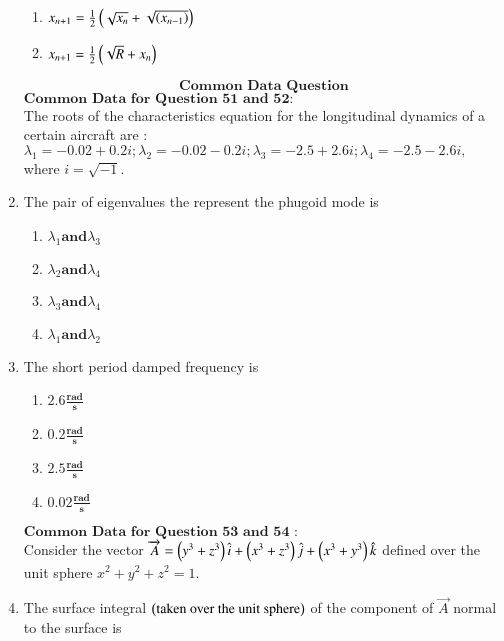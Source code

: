 \documentclass[journal]{IEEEtran}
\begin{document}
\begin{enumerate}[start=49]
\begin{multicols}{2}
\begin{enumerate}
        \item $x_{n+1}=\frac{1}{2}\left(\sqrt{x_{n}}+\sqrt{\left(x_{n-1}\right)}\right)$
        \item $x_{n+1}=\frac{1}{2}\left(\sqrt{R}+x_{n}\right)$        
    \end{enumerate}
\end{multicols}
\bigskip
$$\textbf{Common Data Question}$$
$\textbf{Common Data for Question 51 and 52:}$\\
The roots of the characteristics equation for the longitudinal dynamics of a certain aircraft are :
$\lambda_{1}=-0.02+0.2i;\lambda_{2}=-0.02-0.2i; \lambda_{3}=-2.5+2.6i; \lambda_{4}=-2.5-2.6i,$ where $i=\sqrt{-1}.$\bigskip
\item The pair of eigenvalues the represent the phugoid mode is 
\begin{multicols}{4}
    \begin{enumerate}
        \item $\lambda_{1} \textbf{and} \lambda_{3}$
        \item $\lambda_{2} \textbf{and} \lambda_{4}$
        \item $\lambda_{3} \textbf{and} \lambda_{4}$
        \item $\lambda_{1} \textbf{and} \lambda_{2}$        
    \end{enumerate}
\end{multicols}
\bigskip
\item  The short period damped frequency is 
\begin{multicols}{4}
    \begin{enumerate}
        \item $2.6\frac{\textbf{rad}}{\textbf{s}}$
        \item $0.2\frac{\textbf{rad}}{\textbf{s}}$
        \item $2.5\frac{\textbf{rad}}{\textbf{s}}$
        \item $0.02\frac{\textbf{rad}}{\textbf{s}}$        
    \end{enumerate}
\end{multicols}
\bigskip
$\textbf{Common Data for Question 53 and 54 :}$\\
Consider the vector $\overrightarrow{A}=\left(y^{3}+z^{3}\right)\hat{i}+\left(x^{3}+z^{3}\right)\hat{j}+\left(x^{3}+y^{3}\right)\hat{k}$ defined over the unit sphere $x^{2}+y^{2}+z^{2}=1.$\bigskip
\item The surface integral $\left(\text{taken over the unit sphere}\right)$ of the component of $\overrightarrow{A}$ normal to the surface is
\begin{multicols}{4}

\end{multicols}
\end{enumerate}
\end{document}
